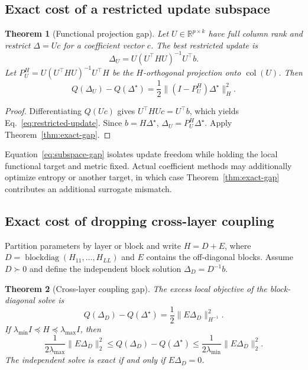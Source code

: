 \documentclass[letterpaper]{article} %
\theoremstyle{plain}
\newtheorem{theorem}{Theorem}
\theoremstyle{definition}
\begin{document}
\subsection{Exact cost of a restricted update subspace}
\label{app:subspace-gap}

\begin{theorem}[Functional projection gap]
\label{thm:subspace-gap}
Let $U\in\mathbb R^{p\times k}$ have full column rank and restrict $\Delta=Uc$ for a coefficient vector $c$.
The best restricted update is
\begin{equation}
\Delta_U
=U(U^\top HU)^{-1}U^\top b.
\label{eq:restricted-update}
\end{equation}
Let $P_U^H=U(U^\top HU)^{-1}U^\top H$ be the $H$-orthogonal projection onto $\operatorname{col}(U)$.
Then
\begin{equation}
Q(\Delta_U)-Q(\Delta^\star)
=\frac12\|(I-P_U^H)\Delta^\star\|_H^2.
\label{eq:subspace-gap}
\end{equation}
\end{theorem}

\begin{proof}
Differentiating $Q(Uc)$ gives $U^\top HUc=U^\top b$, which yields Eq.~\eqref{eq:restricted-update}.
Since $b=H\Delta^\star$, $\Delta_U=P_U^H\Delta^\star$.
Apply Theorem~\ref{thm:exact-gap}.
\end{proof}

Equation~\eqref{eq:subspace-gap} isolates update freedom while holding the local functional target and metric fixed.
Actual coefficient methods may additionally optimize entropy or another target, in which case Theorem~\ref{thm:exact-gap} contributes an additional surrogate mismatch.

\subsection{Exact cost of dropping cross-layer coupling}
\label{app:cross-layer-gap}

Partition parameters by layer or block and write $H=D+E$, where $D=\operatorname{blockdiag}(H_{11},\ldots,H_{LL})$ and $E$ contains the off-diagonal blocks.
Assume $D\succ0$ and define the independent block solution $\Delta_D=D^{-1}b$.

\begin{theorem}[Cross-layer coupling gap]
\label{thm:cross-layer-gap}
The excess local objective of the block-diagonal solve is
\begin{equation}
Q(\Delta_D)-Q(\Delta^\star)
=\frac12\|E\Delta_D\|_{H^{-1}}^2.
\label{eq:cross-layer-gap}
\end{equation}
If $\lambda_{\min}I\preceq H\preceq\lambda_{\max}I$, then
\begin{equation}
\frac{1}{2\lambda_{\max}}\|E\Delta_D\|_2^2
\le Q(\Delta_D)-Q(\Delta^\star)
\le\frac{1}{2\lambda_{\min}}\|E\Delta_D\|_2^2.
\label{eq:cross-layer-bounds}
\end{equation}
The independent solve is exact if and only if $E\Delta_D=0$.
\end{theorem}
\end{document}
